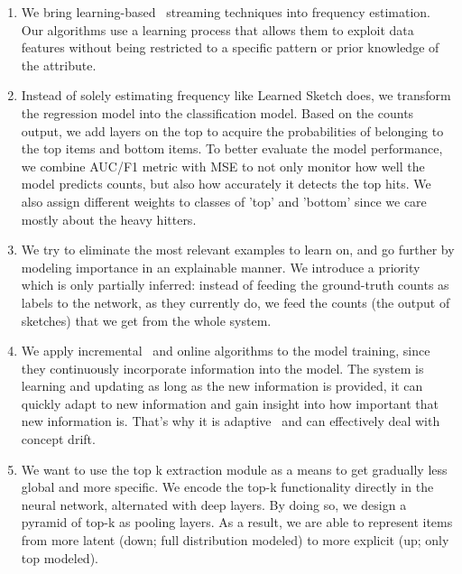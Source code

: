 \begin{enumerate}
    \item We bring learning-based~\cite{chen2014deep} streaming techniques into frequency estimation. Our algorithms use a learning process that allows them to exploit data features without being restricted to a specific pattern or prior knowledge of the attribute.  
    
    \item Instead of solely estimating frequency like Learned Sketch does, we transform the regression model into the classification model. Based on the counts output, we add layers on the top to acquire the probabilities of belonging to the top items and bottom items. To better evaluate the model performance, we combine AUC/F1 metric with MSE to not only monitor how well the model predicts counts, but also how accurately it detects the top hits. We also assign different weights to classes of 'top' and 'bottom' since we care mostly about the heavy hitters.
    
    \item We try to eliminate the most relevant examples to learn on, and go further by modeling importance in an explainable manner. We introduce a priority which is only partially inferred: instead of feeding the ground-truth counts as labels to the network, as they currently do, we feed the counts (the output of sketches) that we get from the whole system.
    
    \item We apply incremental~\cite{wu2019large} and online algorithms to the model training, since they continuously incorporate information into the model. The system is learning and updating as long as the new information is provided, it can quickly adapt to new information and gain insight into how important that new information is. That's why it is adaptive~\cite{wu2019real} and can effectively deal with concept drift. 
    
    \item We want to use the top k extraction module as a means to get gradually less global and more specific. We encode the top-k functionality directly in the neural network, alternated with deep layers. By doing so, we design a pyramid of top-k as pooling layers. As a result, we are able to represent items from more latent (down; full distribution modeled) to more explicit (up; only top modeled). 
    
\end{enumerate}

